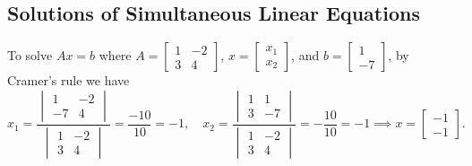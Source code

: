 \subsection{Solutions of Simultaneous Linear Equations}
\begin{example}
   To solve $Ax=b$ where $A=
   \begin{bmatrix}
       1 & -2 \\
       3 & 4
   \end{bmatrix}$, $x=
   \begin{bmatrix}
       x_1\\
       x_2
   \end{bmatrix}$, and $b=
   \begin{bmatrix}
       1\\
       -7
   \end{bmatrix}$, by Cramer's rule we have \[
   x_1=\frac{
   \begin{vmatrix}
       1 & -2 \\
       -7 & 4
   \end{vmatrix}}{
   \begin{vmatrix}
       1 & -2\\
       3 & 4
   \end{vmatrix}}=\frac{-10}{10}=-1,\quad x_2=
   \frac{
   \begin{vmatrix}
       1 & 1 \\
       3 & -7
   \end{vmatrix}}{
   \begin{vmatrix}
       1 & -2\\
       3 & 4
   \end{vmatrix}}=-\frac{10}{10}=-1\implies x=
   \begin{bmatrix}
       -1\\
       -1
   \end{bmatrix}.
   \] 
\end{example}

